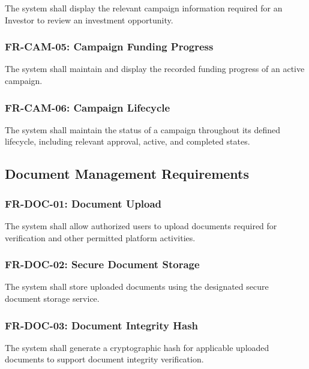 The system shall display the relevant campaign information required for an
Investor to review an investment opportunity.

\subsubsection{FR-CAM-05: Campaign Funding Progress}

The system shall maintain and display the recorded funding progress of an
active campaign.

\subsubsection{FR-CAM-06: Campaign Lifecycle}

The system shall maintain the status of a campaign throughout its defined
lifecycle, including relevant approval, active, and completed states.



\subsection{Document Management Requirements}

\subsubsection{FR-DOC-01: Document Upload}

The system shall allow authorized users to upload documents required for
verification and other permitted platform activities.

\subsubsection{FR-DOC-02: Secure Document Storage}

The system shall store uploaded documents using the designated secure
document storage service.

\subsubsection{FR-DOC-03: Document Integrity Hash}

The system shall generate a cryptographic hash for applicable uploaded
documents to support document integrity verification.

